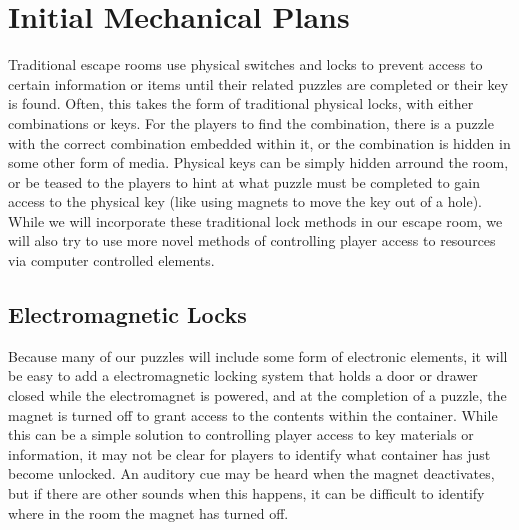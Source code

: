 \documentclass[conference]{IEEEtran}
\begin{document}
\begin{table}[ht]
    \centering
    \caption{Milestones for each team member by December.}
\end{table}                   

\section{Initial Mechanical Plans}
Traditional escape rooms use physical switches and locks to prevent access to certain information or
items until their related puzzles are completed or their key is found. Often, this takes the form of
traditional physical locks, with either combinations or keys. For the players to find the combination,
there is a puzzle with the correct combination embedded within it, or the combination is hidden in some
other form of media. Physical keys can be simply hidden arround the room, or be teased to the players
to hint at what puzzle must be completed to gain access to the physical key (like using magnets to move
the key out of a hole). While we will incorporate these traditional lock methods in our escape room,
we will also try to use more novel methods of controlling player access to resources via computer controlled
elements.

\subsection{Electromagnetic Locks}
Because many of our puzzles will include some form of electronic elements, it will be easy to add a
electromagnetic locking system that holds a door or drawer closed while the electromagnet is powered,
and at the completion of a puzzle, the magnet is turned off to grant access to the contents within the
container. While this can be a simple solution to controlling player access to key materials or information,
it may not be clear for players to identify what container has just become unlocked. An auditory cue may
be heard when the magnet deactivates, but if there are other sounds when this happens, it can be difficult
to identify where in the room the magnet has turned off.
\end{document}
